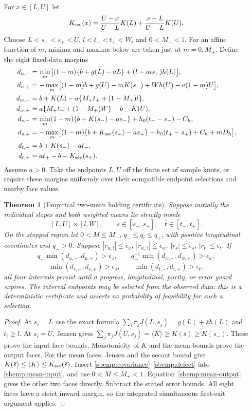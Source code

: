 \documentclass{article} %
\theoremstyle{plain}
\newtheorem{theorem}{Theorem}[section]
\theoremstyle{definition}
\theoremstyle{remark}
\begin{document}
For $x\in[L,U]$ let
\[
 K_{\rm sec}(x)=\frac{U-x}{U-L}K(L)+\frac{x-L}{U-L}K(U).
\]
Choose $L<s_-<s_+<U$, $l<t_-<t_+<W$, and $0<M_+<1$.
For an affine function of $m$, minima and maxima below are taken just
at $m=0,M_+$. Define the eight fixed-data margins
\begin{align*}
 d_{u,-}&=\min_m\bigl[(1-m)\{b+g(L)-aL\}+(l-ms_+)h(L)\bigr],\\
 d_{u,+}&=-\max_m\bigl[(1-m)b+g(U)-mK(s_-)+Wh(U)-a(1-m)U\bigr],\\
 d_{w,-}&=b+K(L)-a\{M_+t_++(1-M_+)l\},\\
 d_{w,+}&=a\{M_+t_-+(1-M_+)W\}-b-K(U),\\
 d_{s,-}&=\min_m(1-m)\{b+K(s_-)-as_-\}
                       +h_0(t_--s_-)-C_h,\\
 d_{s,+}&=-\max_m\bigl[(1-m)\{b+K_{\rm sec}(s_+)-as_+\}
                       +h_0(t_+-s_+)+C_h+mD_h\bigr],\\
 d_{t,-}&=b+K(s_-)-at_-,\\
 d_{t,+}&=at_+-b-K_{\rm sec}(s_+).
\end{align*}
Assume $a>0$. Take the endpoints $L,U$ off the finite set of sample
knots, or require these margins uniformly over their compatible endpoint
selections and nearby face values.

\begin{theorem}[Empirical two-mean holding certificate]
\label{sbemp:holding}
Suppose initially the individual slopes and both weighted means lie
strictly inside
\[
 [L,U]\times[l,W],\qquad
 \bar s\in[s_-,s_+],\quad\bar t\in[t_-,t_+].
\]
On the stopped region let $0<M\le M_+$, $q_-\le q_i\le q_+$,
with positive longitudinal coordinates and $q_->0$.
Suppose $|r_{u,i}|\le\epsilon_u$, $|r_{w,i}|\le\epsilon_w$,
$|r_s|\le\epsilon_s$, $|r_t|\le\epsilon_t$.
If
\[
 q_-\min(d_{u,-},d_{u,+})>\epsilon_u,\qquad
 q_+^{-1}\min(d_{w,-},d_{w,+})>\epsilon_w,
\]
\[
 \min(d_{s,-},d_{s,+})>\epsilon_s,\qquad
 \min(d_{t,-},d_{t,+})>\epsilon_t,
\]
all four intervals persist until a progress, longitudinal, purity, or
error guard expires. The interval endpoints may be selected from the
observed data: this is a deterministic certificate and asserts no
probability of feasibility for such a selection.
\end{theorem}
\begin{proof}
At $s_i=L$ use the exact formula
$\sum_j\pi_jJ(L,s_j)=g(L)+\bar s h(L)$ and $t_i\ge l$.
At $s_i=U$, Jensen gives
$\sum_j\pi_jJ(U,s_j)=\langle K\rangle\ge K(\bar s)\ge K(s_-)$.
These prove the input face bounds. Monotonicity of $K$ and the mean
bounds prove the output faces.
For the mean faces, Jensen and the secant bound give
$K(\bar s)\le\langle K\rangle\le K_{\rm sec}(\bar s)$.
Insert \eqref{sbemp:covariance}--\eqref{sbemp:defect} into
\eqref{sbemp:mean-input}, and use $0<M\le M_+<1$.
Equation~\eqref{sbemp:mean-output} gives the other two faces directly.
Subtract the stated error bounds. All eight faces have a strict inward
margin, so the integrated simultaneous first-exit argument applies.
\end{proof}
\end{document}
